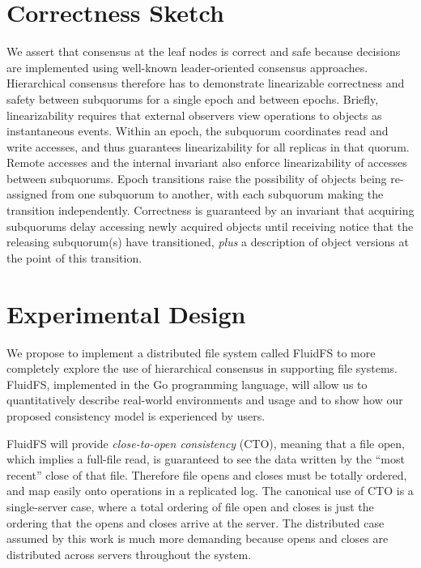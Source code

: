 \documentclass[sigconf]{acmart}
\begin{document}
\section{Correctness Sketch}

We assert that consensus at the leaf nodes is correct and safe because decisions are
implemented using well-known leader-oriented consensus approaches.
Hierarchical consensus therefore has to demonstrate linearizable correctness and safety
between subquorums for a single epoch and between epochs.
Briefly, linearizability requires that external observers view operations to objects as
instantaneous events.
Within an epoch, the subquorum coordinates read and write accesses, and thus guarantees
linearizability for all replicas in that quorum.
Remote accesses and the internal invariant also enforce linearizability of accesses
between subquorums.
Epoch transitions raise the possibility of objects being re-assigned from one subquorum to
another, with each subquorum making the transition independently. Correctness is
guaranteed by an invariant that acquiring subquorums delay accessing newly acquired objects
until receiving notice that the releasing subquorum(s) have transitioned, \emph{plus} a
description of object versions at the point of this transition.


\section{Experimental Design}

We propose to implement a distributed file system called FluidFS to more completely explore
the use of hierarchical consensus in supporting file systems.
FluidFS, implemented in the Go programming language, will allow us to quantitatively
describe real-world environments and usage and to show how our proposed consistency
model is experienced by users.

FluidFS will provide \emph{close-to-open consistency} (CTO), meaning that a file
open, which implies a full-file read, is guaranteed to see the data written by the ``most recent'' close of
that file.
Therefore file opens and closes must be totally ordered, and map
easily onto operations in a replicated log.
The canonical use of CTO is a single-server case, where a total
ordering of file open and closes is just the ordering that the opens
and closes arrive at the server.
The distributed case assumed by this work is much more demanding because
opens and closes are distributed across servers throughout the system.
\end{document}
